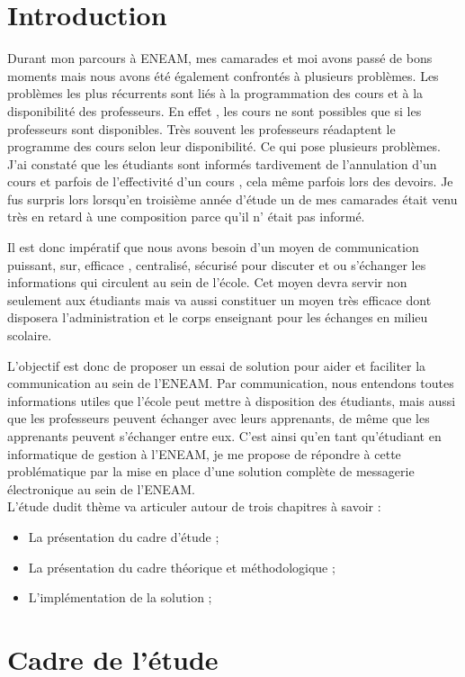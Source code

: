 \documentclass[a4paper,12pt,french]{report} %
\begin{document}
\chapter*{Introduction}
	Durant mon parcours à ENEAM, mes camarades et moi avons passé de bons moments mais nous avons été également confrontés à plusieurs problèmes. Les problèmes les plus récurrents sont liés à la programmation des cours et  à la disponibilité des professeurs. En effet , les cours ne sont possibles que si les professeurs sont disponibles. Très souvent les professeurs réadaptent le programme des cours selon leur disponibilité. Ce qui pose plusieurs problèmes. J'ai constaté que les étudiants sont informés tardivement de l'annulation d'un cours et parfois de l'effectivité d'un cours , cela même parfois lors des devoirs. Je fus surpris lors lorsqu'en troisième année d'étude un de mes camarades était venu très en retard à une composition parce qu'il n' était pas informé.
	
	 Il est donc impératif que nous avons besoin d'un moyen de communication puissant, sur, efficace , centralisé, sécurisé pour discuter et ou s'échanger les informations qui circulent au sein de l'école. Cet moyen devra servir non seulement aux étudiants mais va aussi constituer un moyen très efficace dont disposera l'administration et le corps enseignant pour les échanges en milieu scolaire. 

	L'objectif est donc de proposer un essai de solution pour aider et faciliter la communication au sein de l'ENEAM. Par communication, nous entendons toutes informations utiles que l'école peut mettre à disposition des étudiants, mais aussi que les professeurs peuvent échanger avec leurs apprenants, de même que les apprenants peuvent s'échanger entre eux. C'est ainsi qu'en tant qu'étudiant en informatique de gestion à l'ENEAM, je me propose de répondre à cette problématique par la mise en place d'une solution complète de messagerie électronique au sein de l'ENEAM. \\

L'étude dudit thème va articuler autour de trois chapitres à savoir :
\begin{itemize}
	\item La présentation du cadre d'étude ;
	\item La présentation du cadre théorique et méthodologique ;
	\item L'implémentation de la solution ;
\end{itemize}

\chapter{Cadre de l'étude}
\end{document}
